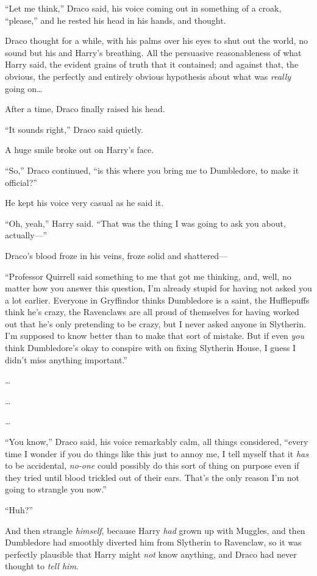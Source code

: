 “Let me think,” Draco said, his voice coming out in something of a croak, “please,” and he rested his head in his hands, and thought.

\later

Draco thought for a while, with his palms over his eyes to shut out the world, no sound but his and Harry’s breathing. All the persuasive reasonableness of what Harry said, the evident grains of truth that it contained; and against that, the obvious, the perfectly and entirely obvious hypothesis about what was \emph{really} going on…

After a time, Draco finally raised his head.

“It sounds right,” Draco said quietly.

A huge smile broke out on Harry’s face.

“So,” Draco continued, “is this where you bring me to Dumbledore, to make it official?”

He kept his voice very casual as he said it.

“Oh, yeah,” Harry said. “That was the thing I was going to ask you about, actually—”

Draco’s blood froze in his veins, froze solid and shattered—

“Professor Quirrell said something to me that got me thinking, and, well, no matter how you answer this question, I’m already stupid for having not asked you a lot earlier. Everyone in Gryffindor thinks Dumbledore is a saint, the Hufflepuffs think he’s crazy, the Ravenclaws are all proud of themselves for having worked out that he’s only pretending to be crazy, but I never asked anyone in Slytherin. I’m supposed to know better than to make that sort of mistake. But if even \emph{you} think Dumbledore’s okay to conspire with on fixing Slytherin House, I guess I didn’t miss anything important.”

…

…

…

“You know,” Draco said, his voice remarkably calm, all things considered, “every time I wonder if you do things like this just to annoy me, I tell myself that it \emph{has} to be accidental, \emph{no-one} could possibly do this sort of thing on purpose even if they tried until blood trickled out of their ears. That’s the only reason I’m not going to strangle you now.”

“Huh?”

And then strangle \emph{himself}, because Harry \emph{had} grown up with Muggles, and then Dumbledore had smoothly diverted him from Slytherin to Ravenclaw, so it was perfectly plausible that Harry might \emph{not} know anything, and Draco had never thought to \emph{tell him}.

